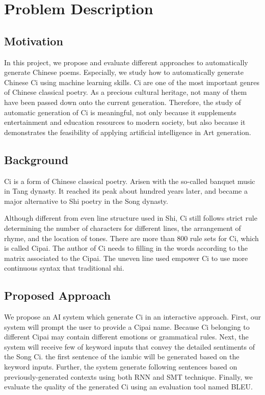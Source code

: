 \section{Problem Description}
\subsection{Motivation}
In this project, we propose and evaluate different approaches to automatically generate Chinese poems. 
%
Especially, we study how to automatically generate Chinese Ci using machine learning skills.
%
Ci are one of the most important genres of Chinese classical poetry. 
%
As a precious cultural heritage, not many of them have been passed down onto the current generation.
%
Therefore, the study of automatic generation of Ci is meaningful, not only because it supplements entertainment and education resources to modern society, but also because it demonstrates the feasibility of applying artificial intelligence in Art generation. 
%

\subsection{Background}
Ci is a form of Chinese classical poetry. Arisen with the so-called banquet music in Tang dynasty. It reached its peak about hundred years later, and became a major alternative to Shi poetry\cite{cai2008chinesepoetry} in the Song dynasty.

Although different from even line structure used in Shi, Ci still follows strict rule determining the number of characters for different lines, the arrangement of rhyme, and the location of tones. There are more than 800 rule sets for Ci, which is called Cipai\cite{wikici}. The author of Ci needs to filling in the words according to the matrix associated to the Cipai. The uneven line used empower Ci to use more continuous syntax that traditional shi\cite{cai2008chinesepoetry}.

\subsection{Proposed Approach}
We propose an AI system which generate Ci in an interactive approach.
%
First, our system will prompt the user to provide a Cipai name.
%
Because Ci belonging to different Cipai may contain different emotions or grammatical rules.
%
Next, the system will receive few of keyword inputs that convey the detailed sentiments of the Song Ci.
%
the first sentence of the iambic will be generated based on the keyword inputs.
%
Further, the system generate following sentences based on previously-generated contexts using both RNN and SMT technique.
%
Finally, we evaluate the quality of the generated Ci using an evaluation tool named BLEU.

